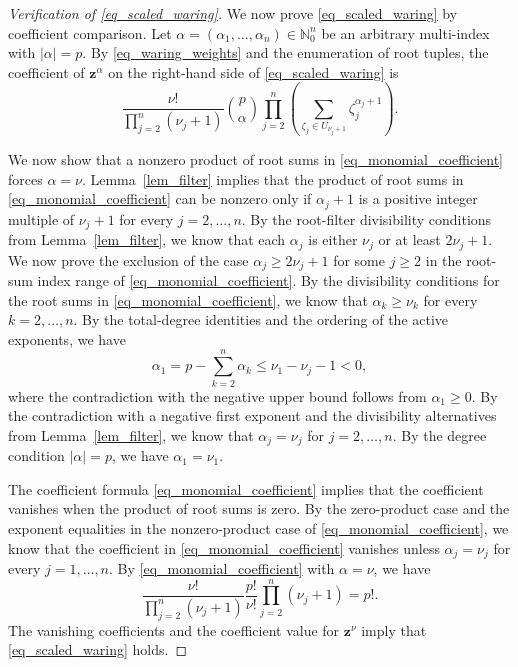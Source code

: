 \documentclass[final,oneeqnum]{siamltex}
\let\originalbibliography
\renewcommand{}[1]{\FloatBarrier\Needspace{8\baselineskip}{\raggedbottom\interlinepenalty=10000\originalbibliography{#1}}}
\newcommand{\N}{\mathbb{N}}
\newcommand{\bz}{\bm{z}}
\newcommand{\abs}[1]{\left|#1\right|}
\begin{document}
\begingroup
{}
\begin{proof}[Verification of \eqref{eq_scaled_waring}]
    We now prove \eqref{eq_scaled_waring} by coefficient comparison.
    Let $\alpha = (\alpha_1, \ldots, \alpha_n) \in \N_0^n$ be an arbitrary multi-index with $\abs{\alpha} = p$.
    By \eqref{eq_waring_weights} and the enumeration of root tuples, the coefficient of $\bz^\alpha$ on the right-hand side of \eqref{eq_scaled_waring} is
    \begin{equation}\label{eq_monomial_coefficient}
        \frac{\nu!}{\prod_{j = 2}^{n} (\nu_j + 1)} \binom{p}{\alpha} \prod_{j = 2}^{n} \left( \sum_{\zeta_j \in U_{\nu_j + 1}} \zeta_j^{\alpha_j + 1} \right).
    \end{equation}

    We now show that a nonzero product of root sums in \eqref{eq_monomial_coefficient} forces $\alpha = \nu$.
    Lemma~\ref{lem_filter} implies that the product of root sums in \eqref{eq_monomial_coefficient} can be nonzero only if $\alpha_j + 1$ is a positive integer multiple of $\nu_j + 1$ for every $j = 2, \ldots, n$.
    By the root-filter divisibility conditions from Lemma~\ref{lem_filter}, we know that each $\alpha_j$ is either $\nu_j$ or at least $2 \nu_j + 1$.
    We now prove the exclusion of the case $\alpha_j \geq 2 \nu_j + 1$ for some $j \geq 2$ in the root-sum index range of \eqref{eq_monomial_coefficient}.
    By the divisibility conditions for the root sums in \eqref{eq_monomial_coefficient}, we know that $\alpha_k \geq \nu_k$ for every $k = 2, \ldots, n$.
    By the total-degree identities and the ordering of the active exponents, we have
    \begin{equation*}
        \alpha_1 = p - \sum_{k = 2}^{n} \alpha_k \leq \nu_1 - \nu_j - 1 < 0,
    \end{equation*}
    where the contradiction with the negative upper bound follows from $\alpha_1 \geq 0$.
    By the contradiction with a negative first exponent and the divisibility alternatives from Lemma~\ref{lem_filter}, we know that $\alpha_j = \nu_j$ for $j = 2, \ldots, n$.
    By the degree condition $\abs{\alpha} = p$, we have $\alpha_1 = \nu_1$.

    The coefficient formula \eqref{eq_monomial_coefficient} implies that the coefficient vanishes when the product of root sums is zero.
    By the zero-product case and the exponent equalities in the nonzero-product case of \eqref{eq_monomial_coefficient}, we know that the coefficient in \eqref{eq_monomial_coefficient} vanishes unless $\alpha_j = \nu_j$ for every $j = 1, \ldots, n$.
    By \eqref{eq_monomial_coefficient} with $\alpha = \nu$, we have
    \begin{equation*}
        \frac{\nu!}{\prod_{j = 2}^{n} (\nu_j + 1)} \frac{p!}{\nu!} \prod_{j = 2}^{n} (\nu_j + 1) = p!.
    \end{equation*}
    The vanishing coefficients and the coefficient value for $\bz^\nu$ imply that \eqref{eq_scaled_waring} holds.
\end{proof}
\endgroup

\FloatBarrier


\end{document}
